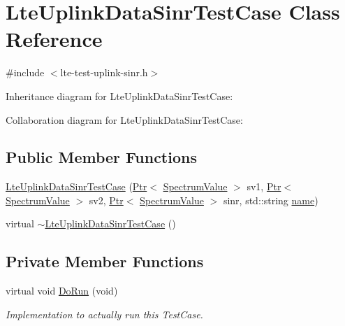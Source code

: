\hypertarget{classLteUplinkDataSinrTestCase}{}\section{Lte\+Uplink\+Data\+Sinr\+Test\+Case Class Reference}
\label{classLteUplinkDataSinrTestCase}


{\ttfamily \#include $<$lte-\/test-\/uplink-\/sinr.\+h$>$}



Inheritance diagram for Lte\+Uplink\+Data\+Sinr\+Test\+Case\+:


Collaboration diagram for Lte\+Uplink\+Data\+Sinr\+Test\+Case\+:
\subsection*{Public Member Functions}
\begin{DoxyCompactItemize}
\item 
\hyperlink{classLteUplinkDataSinrTestCase_ae7bdb68d224abff2c20e4ecaa0973598}{Lte\+Uplink\+Data\+Sinr\+Test\+Case} (\hyperlink{classns3_1_1Ptr}{Ptr}$<$ \hyperlink{classns3_1_1SpectrumValue}{Spectrum\+Value} $>$ sv1, \hyperlink{classns3_1_1Ptr}{Ptr}$<$ \hyperlink{classns3_1_1SpectrumValue}{Spectrum\+Value} $>$ sv2, \hyperlink{classns3_1_1Ptr}{Ptr}$<$ \hyperlink{classns3_1_1SpectrumValue}{Spectrum\+Value} $>$ sinr, std\+::string \hyperlink{generate__test__data__lte__spectrum__model_8m_ab74e6bf80237ddc4109968cedc58c151}{name})
\item 
virtual \hyperlink{classLteUplinkDataSinrTestCase_a194d73b88de5fa6f64c724bd374febd1}{$\sim$\+Lte\+Uplink\+Data\+Sinr\+Test\+Case} ()
\end{DoxyCompactItemize}
\subsection*{Private Member Functions}
\begin{DoxyCompactItemize}
\item 
virtual void \hyperlink{classLteUplinkDataSinrTestCase_a158cf0f2436e26dc99fb8a17f728c1fe}{Do\+Run} (void)
\begin{DoxyCompactList}\small\item\em Implementation to actually run this Test\+Case. \end{DoxyCompactList}\end{DoxyCompactItemize}
